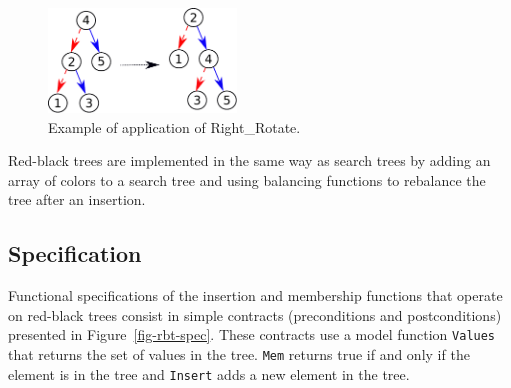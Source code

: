 \documentclass{llncs}
\begin{document}
\begin{figure}[ht]
\vspace{-0.5cm}
\begin{center}
\includegraphics[width=5cm]{rotate_right.pdf}
\caption{\label{fig-search-rot} Example of application of Right\_Rotate.}
\end{center}
\vspace{-0.5cm}
\end{figure}

Red-black trees are implemented in the same way as search trees by adding an
array of colors to a search tree and using balancing functions to rebalance the
tree after an insertion.

\subsection{Specification}

Functional specifications of the insertion and membership functions that operate on
red-black trees consist in simple contracts (preconditions and postconditions)
presented in Figure~\ref{fig-rbt-spec}. These contracts use a model function
\texttt{Values} that returns the set of values in the tree. \texttt{Mem} returns
true if and only if the element is in the tree and \texttt{Insert} adds a new element
in the tree.

\end{document}
